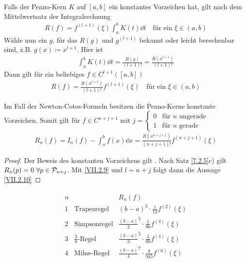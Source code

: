 \begin{Fole}\label{7.2.7}
  Falls der Peano-Kern $K$ auf $[a,b]$ ein konstantes Vorzeichen hat,
  gilt nach dem Mittelwertsatz der Integralrechnung
  \begin{gather}
    R(f) = f^{(l+1)}(\xi) \int_a^b K(t)\dd t 
    \quad \text{für ein }\xi\in (a,b)
    \label{VII.2.8}
  \end{gather}
  Wähle nun ein $g$, für das $R(g)$ und $g^{(l+1)}$ bekannt oder leicht
  berechenbar sind, z.B.
  $g(x)\coloneqq x^{l+1}$. Hier ist
  \begin{gather*}
    \int_a^bK(t)\dd t = \frac{R(g)}{(l+1)!} = \frac{R(x^{l+1})}{(l+1)!}
  \end{gather*}
  Dann gilt für ein beliebiges $f\in C^{l+1}([a,b])$
  \begin{gather}
    R(f) = \frac{R(x^{l+1})}{(l+1)!} f^{(l+1)}(\xi)
    \quad \text{für ein }\xi \in (a,b)
    \label{VII.2.9}
  \end{gather}
\end{Fole}

\begin{Satze}[Approximationsfehler]
  Im Fall der Newton-Cotes-Formeln besitzen die Peano-Kerne
  konstante Vorzeichen. Somit gilt für $f\in C^{n+j+1}$ mit 
  $j= \begin{cases}
    0 & \text{für $n$ ungerade}\\
    1 & \text{für $n$ gerade}
  \end{cases}$
  \begin{gather}
    R_n(f) = \hat{I}_n (f) - \int_a^b f(x) \dd x
           = \frac{R(x^{n+j+1})}{(n+j+1)!}f^{(n+j+1)}(\xi)
             \label{VII.2.10}
  \end{gather}

  \begin{proof}
    Der Beweis des konstanten Vorzeichens gilt
    \cite[siehe][]{steffensen}.
    Nach Satz \ref{7.2.5}c) gilt
      $R_n(p) = 0 ~\forall p\in\mathcal{P}_{n+j}$.
    Mit \eqref{VII.2.9} und $l=n+j$ folgt dann die Aussage \eqref{VII.2.10}
  \end{proof}
\end{Satze}


\begin{gather*}\label{7.2.9}
  \begin{array}{cll}
    n & & R_n(f)\\
    1 &\text{Trapezregel} &(b-a)^3\cdot\frac{1}{12}f^{(2)}(\xi)\\
    2 &\text{Simpsonregel}&\frac{(b-a)}{2}^5\cdot\frac{1}{90}f^{(4)}(\xi)\\
    3 &\text{$\frac{3}{8}$-Regel}&\frac{(b-a)}{3}^5\cdot\frac{3}{80}f^{(4)}(\xi)\\
    4 &\text{Milne-Regel}
        &\frac{(b-a)}{4}^7\cdot\frac{8}{945}f^{(6)}(\xi)\\
  \end{array}
\end{gather*}

